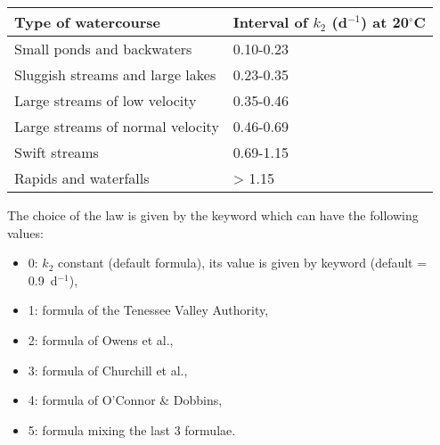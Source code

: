 \begin{table}[H]
 			\centering
\begin{tabular}{p{3.0in}p{3.0in}}
\hline
\multicolumn{1}{|p{3.0in}}{Type of watercourse} & 
\multicolumn{1}{|p{3.0in}|}{Interval of $k_2$ (d$^{-1}$) at 20$^{\circ}$C} \\
\hline
\multicolumn{1}{|p{3.0in}}{Small ponds and backwaters} & 
\multicolumn{1}{|p{3.0in}|}{0.10-0.23} \\
\hline
\multicolumn{1}{|p{3.0in}}{Sluggish streams and large lakes} & 
\multicolumn{1}{|p{3.0in}|}{0.23-0.35} \\
\hline
\multicolumn{1}{|p{3.0in}}{Large streams of low velocity} & 
\multicolumn{1}{|p{3.0in}|}{0.35-0.46} \\
\hline
\multicolumn{1}{|p{3.0in}}{Large streams of normal velocity} & 
\multicolumn{1}{|p{3.0in}|}{0.46-0.69} \\
\hline
\multicolumn{1}{|p{3.0in}}{Swift streams} & 
\multicolumn{1}{|p{3.0in}|}{0.69-1.15} \\
\hline
\multicolumn{1}{|p{3.0in}}{Rapids and waterfalls} & 
\multicolumn{1}{|p{3.0in}|}{> 1.15} \\
\hline

\end{tabular}
\end{table}

The choice of the law is given by the keyword
 which can have the following values:

\begin{itemize}
\item 0: $k_2$ constant (default formula), its value is given by keyword
   (default = 0.9~d$^{-1}$),
\item 1: formula of the Tenessee Valley Authority,
\item 2: formula of Owens et al.,
\item 3: formula of Churchill et al.,
\item 4: formula of O'Connor \& Dobbins,
\item 5: formula mixing the last 3 formulae.
\end{itemize}


